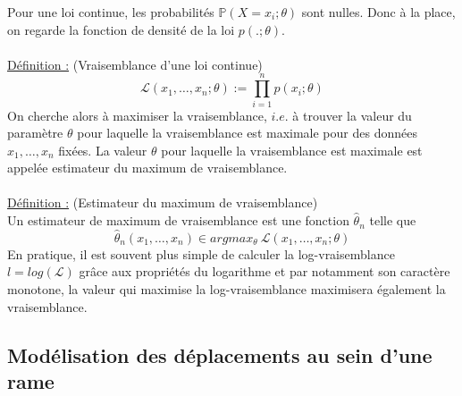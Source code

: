\documentclass[12pt]{article}
\newcommand{\defin}{\underline{Définition :} }
\begin{document}
Pour une loi continue, les probabilités $\mathbb{P}(X= x_i ; \theta)$ sont nulles. Donc à la place, on regarde la fonction de densité de la loi $p(. ; \theta)$.\\
\\
\defin (Vraisemblance d'une loi continue)\[
\mathcal{L}(x_1, \dots, x_n ; \theta) := \prod^n_{i=1}p(x_i ; \theta)
\]
On cherche alors à maximiser la vraisemblance, $i.e.$ à trouver la valeur du paramètre $\theta$ pour laquelle la vraisemblance est maximale pour des données $x_1, \dots, x_n$ fixées. La valeur $\theta$ pour laquelle la vraisemblance est maximale est appelée estimateur du maximum de vraisemblance.\\
\\
\defin (Estimateur du maximum de vraisemblance)\\
Un estimateur de maximum de vraisemblance est une fonction $\hat{\theta}_n$ telle que \[
\hat{\theta}_n(x_1, \dots, x_n) \in argmax_{\theta} \: \mathcal{L}(x_1, \dots, x_n ; \theta)
\]
En pratique, il est souvent plus simple de calculer la log-vraisemblance $l = log(\mathcal{L})$ grâce aux  propriétés du logarithme et par notamment son caractère monotone, la valeur qui maximise la log-vraisemblance maximisera également la vraisemblance.

\subsection{Modélisation des déplacements au sein d'une rame}
\end{document}
